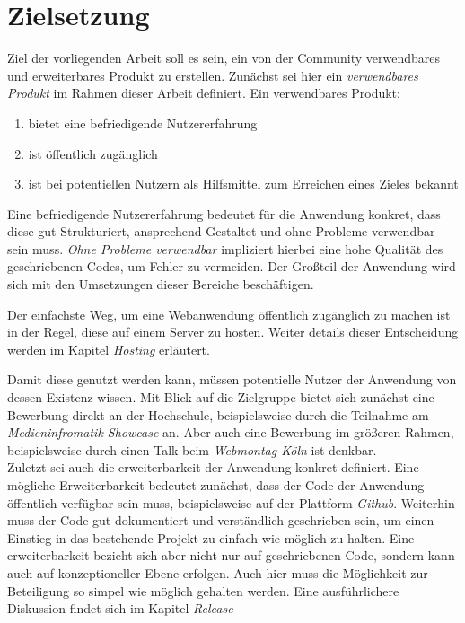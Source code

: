 \section{Zielsetzung}
Ziel der vorliegenden Arbeit soll es sein, ein von der Community verwendbares und erweiterbares Produkt zu erstellen. Zunächst sei hier ein \textit{verwendbares Produkt} im Rahmen dieser Arbeit definiert. Ein verwendbares Produkt:

\begin{enumerate}
  \item bietet eine befriedigende Nutzererfahrung
  \item ist öffentlich zugänglich
  \item ist bei potentiellen Nutzern als Hilfsmittel zum Erreichen eines Zieles bekannt
\end{enumerate}

Eine befriedigende Nutzererfahrung bedeutet für die Anwendung konkret, dass diese gut Strukturiert, ansprechend Gestaltet und ohne Probleme verwendbar sein muss. \textit{Ohne Probleme verwendbar} impliziert hierbei eine hohe Qualität des geschriebenen Codes, um Fehler zu vermeiden. Der Großteil der Anwendung wird sich mit den Umsetzungen dieser Bereiche beschäftigen.

Der einfachste Weg, um eine Webanwendung öffentlich zugänglich zu machen ist in der Regel, diese auf einem Server zu hosten. Weiter details dieser Entscheidung werden im Kapitel \textit{Hosting} erläutert.

Damit diese genutzt werden kann, müssen potentielle Nutzer der Anwendung von dessen Existenz wissen. Mit Blick auf die Zielgruppe bietet sich zunächst eine Bewerbung direkt an der Hochschule, beispielsweise durch die Teilnahme am \textit{Medieninfromatik Showcase} an. Aber auch eine Bewerbung im größeren Rahmen, beispielsweise durch einen Talk beim \textit{Webmontag Köln} ist denkbar.\\

Zuletzt sei auch die erweiterbarkeit der Anwendung konkret definiert. Eine mögliche Erweiterbarkeit bedeutet zunächst, dass der Code der Anwendung öffentlich verfügbar sein muss, beispielsweise auf der Plattform \textit{Github}. Weiterhin muss der Code gut dokumentiert und verständlich geschrieben sein, um einen Einstieg in das bestehende Projekt zu einfach wie möglich zu halten. Eine erweiterbarkeit bezieht sich aber nicht nur auf geschriebenen Code, sondern kann auch auf konzeptioneller Ebene erfolgen. Auch hier muss die Möglichkeit zur Beteiligung so simpel wie möglich gehalten werden. Eine ausführlichere Diskussion findet sich im Kapitel \textit{Release}\\

